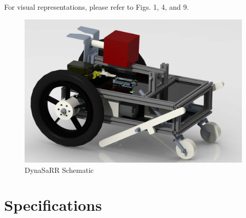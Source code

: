 \documentclass[12pt]{article}
\begin{document}
For visual representations, please refer to Figs. 1, 4, and 9.

\begin{figure}[H]
    \centering
    \includegraphics[width=1.1\linewidth]{PreliminaryDesignReport/55939435_166367590950985_2070774621560373248_n.png}
    \caption{DynaSaRR Schematic}
    \label{fig:my_label}
\end{figure}




\section{Specifications}
\end{document}
